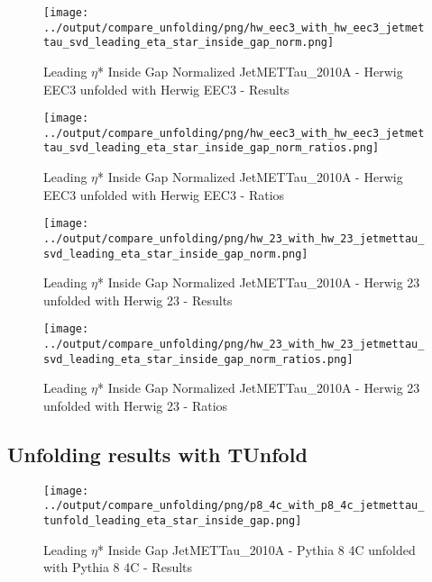\documentclass[11pt]{book}
\begin{document}
\begin{figure}[ht]
\centering
\texttt{[image: ../output/compare\_unfolding/png/hw\_eec3\_with\_hw\_eec3\_jetmettau\_svd\_leading\_eta\_star\_inside\_gap\_norm.png]}
\caption{Leading $\eta$* Inside Gap Normalized JetMETTau\_2010A - Herwig EEC3 unfolded with Herwig EEC3 - Results}
\label{hw_eec3_hw_eec3_jetmettau_svd_leading_eta_star_inside_gap_norm_a}
\end{figure}

\begin{figure}[ht]
\centering
\texttt{[image: ../output/compare\_unfolding/png/hw\_eec3\_with\_hw\_eec3\_jetmettau\_svd\_leading\_eta\_star\_inside\_gap\_norm\_ratios.png]}
\caption{Leading $\eta$* Inside Gap Normalized JetMETTau\_2010A - Herwig EEC3 unfolded with Herwig EEC3 - Ratios}
\label{hw_eec3_hw_eec3_jetmettau_svd_leading_eta_star_inside_gap_norm_b}
\end{figure}

\begin{figure}[ht]
\centering
\texttt{[image: ../output/compare\_unfolding/png/hw\_23\_with\_hw\_23\_jetmettau\_svd\_leading\_eta\_star\_inside\_gap\_norm.png]}
\caption{Leading $\eta$* Inside Gap Normalized JetMETTau\_2010A - Herwig 23 unfolded with Herwig 23 - Results}
\label{hw_23_hw_23_jetmettau_svd_leading_eta_star_inside_gap_norm_a}
\end{figure}

\begin{figure}[ht]
\centering
\texttt{[image: ../output/compare\_unfolding/png/hw\_23\_with\_hw\_23\_jetmettau\_svd\_leading\_eta\_star\_inside\_gap\_norm\_ratios.png]}
\caption{Leading $\eta$* Inside Gap Normalized JetMETTau\_2010A - Herwig 23 unfolded with Herwig 23 - Ratios}
\label{hw_23_hw_23_jetmettau_svd_leading_eta_star_inside_gap_norm_b}
\end{figure}




\clearpage
\subsection{Unfolding results with TUnfold}


\begin{figure}[ht]
\centering
\texttt{[image: ../output/compare\_unfolding/png/p8\_4c\_with\_p8\_4c\_jetmettau\_tunfold\_leading\_eta\_star\_inside\_gap.png]}
\caption{Leading $\eta$* Inside Gap JetMETTau\_2010A - Pythia 8 4C unfolded with Pythia 8 4C - Results}
\label{p8_p8_jetmettau_tunfold_leading_eta_star_inside_gap_a}
\end{figure}
\end{document}
